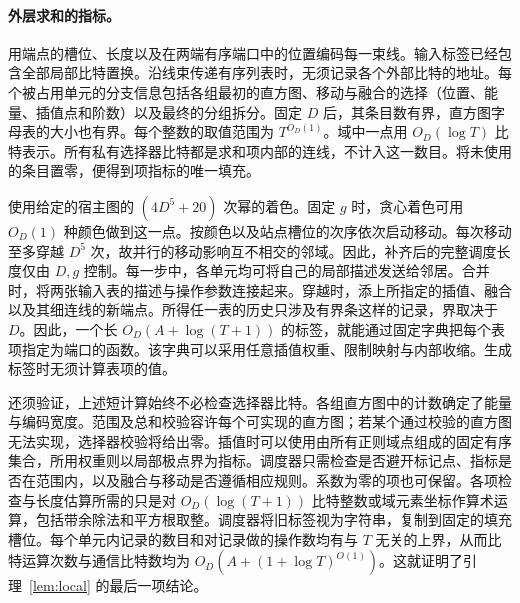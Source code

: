 \paragraph{外层求和的指标。}用端点的槽位、长度以及在两端有序端口中的位置编码每一束线。输入标签已经包含全部局部比特置换。沿线束传递有序列表时，无须记录各个外部比特的地址。每个被占用单元的分支信息包括各组最初的直方图、移动与融合的选择（位置、能量、插值点和阶数）以及最终的分组拆分。固定 \(D\) 后，其条目数有界，直方图字母表的大小也有界。每个整数的取值范围为 \(T^{O_D(1)}\)。域中一点用 \(O_D(\log T)\) 比特表示。所有私有选择器比特都是求和项内部的连线，不计入这一数目。将未使用的条目置零，便得到项指标的唯一填充。

使用给定的宿主图的 \((4D^5+20)\) 次幂的着色。固定 \(g\) 时，贪心着色可用 \(O_D(1)\) 种颜色做到这一点。按颜色以及站点槽位的次序依次启动移动。每次移动至多穿越 \(D^5\) 次，故并行的移动影响互不相交的邻域。因此，补齐后的完整调度长度仅由 \(D,g\) 控制。每一步中，各单元均可将自己的局部描述发送给邻居。合并时，将两张输入表的描述与操作参数连接起来。穿越时，添上所指定的插值、融合以及其细连线的新端点。所得任一表的历史只涉及有界条这样的记录，界取决于 \(D\)。因此，一个长 \(O_D(A+\log(T+1))\) 的标签，就能通过固定字典把每个表项指定为端口的函数。该字典可以采用任意插值权重、限制映射与内部收缩。生成标签时无须计算表项的值。

还须验证，上述短计算始终不必检查选择器比特。各组直方图中的计数确定了能量与编码宽度。范围及总和校验容许每个可实现的直方图；若某个通过校验的直方图无法实现，选择器校验将给出零。插值时可以使用由所有正则域点组成的固定有序集合，所用权重则以局部极点界为指标。调度器只需检查是否避开标记点、指标是否在范围内，以及融合与移动是否遵循相应规则。系数为零的项也可保留。各项检查与长度估算所需的只是对 \(O_D(\log(T+1))\) 比特整数或域元素坐标作算术运算，包括带余除法和平方根取整。调度器将旧标签视为字符串，复制到固定的填充槽位。每个单元内记录的数目和对记录做的操作数均有与 \(T\) 无关的上界，从而比特运算次数与通信比特数均为 \(O_D(A+(1+\log T)^{O(1)})\)。这就证明了引理~\ref{lem:local} 的最后一项结论。
